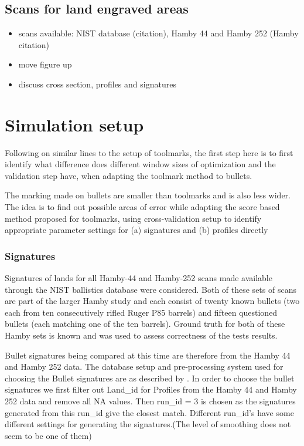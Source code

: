 \documentclass[12pt]{article}
\providecommand{\tightlist}{%
  \setlength{\itemsep}{0pt}\setlength{\parskip}{0pt}}
\begin{document}
\subsection{Scans for land engraved
areas}\label{scans-for-land-engraved-areas-1}

\begin{itemize}
\tightlist
\item
  scans available: NIST database (citation), Hamby 44 and Hamby 252
  (Hamby citation)
\item
  move figure up
\item
  discuss cross section, profiles and signatures
\end{itemize}

\section{Simulation setup}\label{simulation-setup}

Following on similar lines to the setup of toolmarks, the first step
here is to first identify what difference does different window sizes of
optimization and the validation step have, when adapting the toolmark
method to bullets.

The marking made on bullets are smaller than toolmarks and is also less
wider. The idea is to find out possible areas of error while adapting
the score based method proposed for toolmarks, using cross-validation
setup to identify appropriate parameter settings for (a) signatures and
(b) profiles directly

\subsubsection{Signatures}\label{signatures}

Signatures of lands for all Hamby-44 and Hamby-252 scans made available
through the NIST ballistics database \citep{nist} were considered. Both
of these sets of scans are part of the larger Hamby study \citep{hamby}
and each consist of twenty known bullets (two each from ten
consecutively rifled Ruger P85 barrels) and fifteen questioned bullets
(each matching one of the ten barrels). Ground truth for both of these
Hamby sets is known and was used to assess correctness of the tests
results.

Bullet signatures being compared at this time are therefore from the
Hamby 44 and Hamby 252 data. The database setup and pre-processing
system used for choosing the Bullet signatures are as described by
\citet{aoas}. In order to choose the bullet signatures we first filter
out Land\_id for Profiles from the Hamby 44 and Hamby 252 data and
remove all NA values. Then run\_id = 3 is chosen as the signatures
generated from this run\_id give the closest match. Different run\_id's
have some different settings for generating the signatures.(The level of
smoothing does not seem to be one of them)
\end{document}
